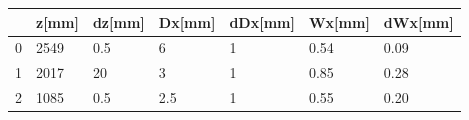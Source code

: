 \begin{tabular}{lllllll}
\toprule
{} & z[mm] & dz[mm] & Dx[mm] & dDx[mm] & Wx[mm] & dWx[mm] \\
\midrule
0 &  2549 &    0.5 &      6 &       1 &   0.54 &    0.09 \\
1 &  2017 &     20 &      3 &       1 &   0.85 &    0.28 \\
2 &  1085 &    0.5 &    2.5 &       1 &   0.55 &    0.20 \\
\bottomrule
\end{tabular}
